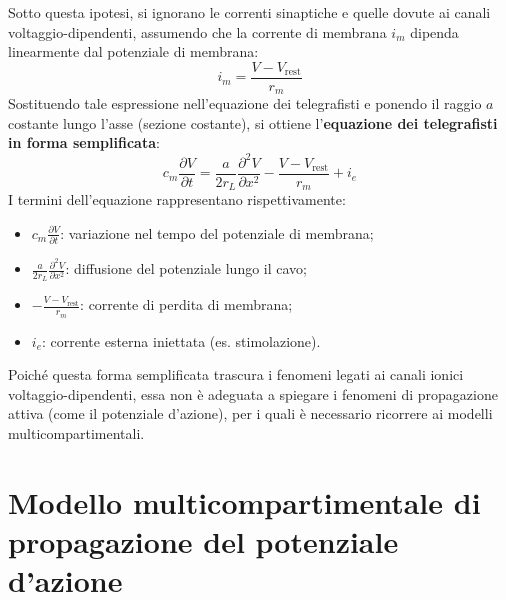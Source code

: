Sotto questa ipotesi, si ignorano le correnti sinaptiche e quelle dovute ai canali voltaggio-dipendenti, assumendo che la corrente di membrana $i_m$ dipenda linearmente dal potenziale di membrana:
\begin{equation}
    i_m = \frac{V - V_{\text{rest}}}{r_m}
\end{equation}
Sostituendo tale espressione nell'equazione dei telegrafisti e ponendo il raggio $a$ costante lungo l'asse (sezione costante), si ottiene l'\textbf{equazione dei telegrafisti in forma semplificata}:
\begin{equation}
    c_m \frac{\partial V}{\partial t} = \frac{a}{2 r_L} \frac{\partial^2 V}{\partial x^2} - \frac{V - V_{\text{rest}}}{r_m} + i_e
\end{equation}
I termini dell'equazione rappresentano rispettivamente:
\begin{itemize}
    \item $c_m \frac{\partial V}{\partial t}$: variazione nel tempo del potenziale di membrana;
    \item $\frac{a}{2 r_L} \frac{\partial^2 V}{\partial x^2}$: diffusione del potenziale lungo il cavo;
    \item $-\frac{V - V_{\text{rest}}}{r_m}$: corrente di perdita di membrana;
    \item $i_e$: corrente esterna iniettata (es. stimolazione).
\end{itemize}
Poiché questa forma semplificata trascura i fenomeni legati ai canali ionici voltaggio-dipendenti, essa non è adeguata a spiegare i fenomeni di propagazione attiva (come il potenziale d'azione), per i quali è necessario ricorrere ai modelli multicompartimentali.

\chapter{Modello multicompartimentale di \\ propagazione del potenziale d'azione}

